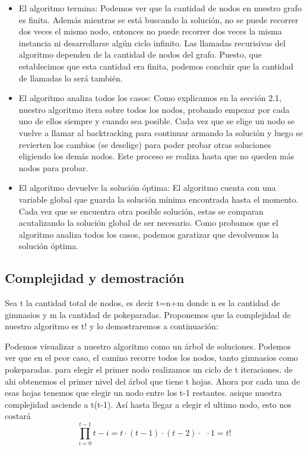 \documentclass[spanish,12pt]{article}
\begin{document}
\begin{itemize}
	\item El algoritmo termina:
Podemos ver que la cantidad de nodos en nuestro grafo es finita. Además mientras se está buscando la solución, no se puede recorrer dos veces el mismo nodo, entonces no puede recorrer dos veces la misma instancia ni desarrollarse algún ciclo infinito. Las llamadas recurisivas del algoritmo dependen de la cantidad de nodos del grafo. Puesto, que establecimos que esta cantidad era finita, podemos concluir que la cantidad de llamadas lo será también.
	\item El algoritmo analiza todos los casos:
Como explicamos en la sección 2.1, nuestro algoritmo itera sobre todos los nodos, probando empezar por cada uno de ellos siempre y cuando sea posible. Cada vez que se elige un nodo se vuelve a llamar al backtracking para continuar armando la solución y luego se revierten los cambios (se deselige) para poder probar otras soluciones eligiendo los demás nodos. Este proceso se realiza hasta que no queden más nodos para probar.
	\item El algoritmo devuelve  la solución óptima:
El algoritmo cuenta con una variable global que guarda la solución mínima encontrada hasta el momento. Cada vez que se encuentra otra posible solución, estas se comparan acutalizando la solución global de ser necesario. Como probamos que el algoritmo analiza todos los casos, podemos garatizar que devolvemos la solución óptima.    

\end{itemize}

\subsection{Complejidad y demostración}

Sea t la cantidad total de nodos, es decir t=n+m donde n es la cantidad de gimnasios y m la cantidad de pokeparadas.
Proponemos que la complejidad de nuestro algoritmo es t! y lo demostraremos a continuación:

Podemos visualizar a nuestro algoritmo como un árbol de soluciones. Podemos ver que en el peor caso, el camino recorre todos los nodos, tanto gimnasios como pokeparadas. 
para elegir el primer nodo realizamos un ciclo de t iteraciones. de ahi obtenemos el primer nivel del árbol que tiene t hojas. Ahora por cada una de esas hojas tenemos que elegir un nodo entre los t-1 restantes. 
asique nuestra complejidad asciende a t(t-1).
Así hasta llegar a elegir el ultimo nodo, esto nos costará \[
\prod_{i=0}^{t-1}t-i=t\cdot(t-1)\cdot(t-2)\cdot \ \ \cdot 1  = t!\] 
\end{document}
